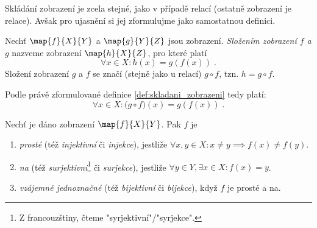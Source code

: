 Skládání zobrazení je zcela stejné, jako v případě relací (ostatně zobrazení je relace). Avšak pro ujasnění si jej zformulujme jako samostatnou definici.
\begin{definition}\label{def:skladani_zobrazeni}
    Nechť $\map{f}{X}{Y}$ a $\map{g}{Y}{Z}$ jsou zobrazení. \emph{Složením zobrazení $f$ a $g$} nazveme zobrazení $\map{h}{X}{Z}$, pro které platí
    \begin{equation*}
        \forall x\in X: h(x)=g(f(x))\; .
    \end{equation*}
    Složení zobrazení $g$ a $f$ se značí (stejně jako u relací) $g\circ f$, tzn. $h=g \circ f$.
\end{definition}
Podle právě zformulované definice \ref{def:skladani_zobrazeni} tedy platí:
\begin{equation*}
    \forall x\in X: \big(g\circ f\big)(x)=g(f(x))\; .
\end{equation*}
\needspace{1cm}
\begin{definition}\label{def:druhy_zobrazeni}
    Nechť je dáno zobrazení $\map{f}{X}{Y}$. Pak $f$ je
    \begin{enumerate}[label=(\roman*)]
        \item \emph{prosté} (též \emph{injektivní} či \emph{injekce}), jestliže $\forall x,y\in X: x\neq y \implies f(x)\neq f(y)$.
        \item \emph{na} (též \emph{surjektivní}\footnote{Z francouzštiny, čteme "syrjektivní"/"syrjekce".} či \emph{surjekce}), jestliže $\forall y\in Y, \exists x\in X: f(x)=y$.
        \item \emph{vzájemně jednoznačné} (též \emph{bijektivní} či \emph{bijekce}), když $f$ je prosté a na.
    \end{enumerate}
\end{definition}
